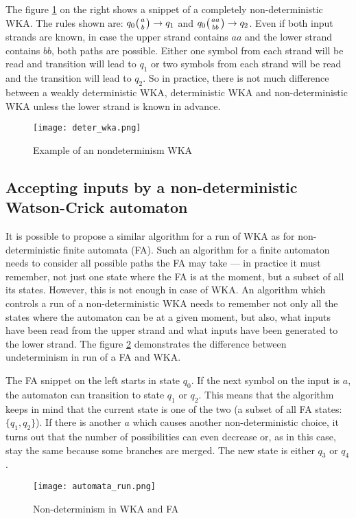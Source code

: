 The figure \ref{fig:deter_WKA} on the right shows a snippet of a completely non-deterministic WKA. The rules shown are: $q_0 \wkpair{a}{b} \rightarrow q_1$ and $q_0 \wkpair{aa}{bb} \rightarrow q_2$. Even if both input strands are known, in case the upper strand contains $aa$ and the lower strand contains $bb$, both paths are possible. Either one symbol from each strand will be read and transition will lead to $q_1$ or two symbols from each strand will be read and the transition will lead to $q_2$. So in practice, there is not much difference between a weakly deterministic WKA, deterministic WKA and non-deterministic WKA unless the lower strand is known in advance.

\begin{figure}[h]
  \centering
  \texttt{[image: deter\_wka.png]}
  \caption{Example of an nondeterminism WKA}
  \label{fig:deter_WKA}
\end{figure}


\subsection{Accepting inputs by a non-deterministic Watson-Crick automaton}
It is possible to propose a similar algorithm for a run of WKA as for non-deterministic finite automata (FA). Such an algorithm for a finite automaton needs to consider all possible paths the FA may take --- in practice it must remember, not just one state where the FA is at the moment, but a subset of all its states. However, this is not enough in case of WKA. An algorithm which controls a run of a non-deterministic WKA needs to remember not only all the states where the automaton can be at a given moment, but also, what inputs have been read from the upper strand and what inputs have been generated to the lower strand. The figure \ref{fig:automata_run} demonstrates the difference between undeterminism in run of a FA and WKA.

The FA snippet on the left starts in state $q_0$. If the next symbol on the input is $a$, the automaton can transition to state $q_1$ or $q_2$. This means that the algorithm keeps in mind that the current state is one of the two (a subset of all FA states: $\{q_1, q_2\}$). If there is another $a$ which causes another non-deterministic choice, it turns out that the number of possibilities can even decrease or, as in this case, stay the same because some branches are merged. The new state is either $q_3$ or $q_4$.

\begin{figure}[h]
  \centering
  \texttt{[image: automata\_run.png]}
  \caption{Non-determinism in WKA and FA}
  \label{fig:automata_run}
\end{figure}

